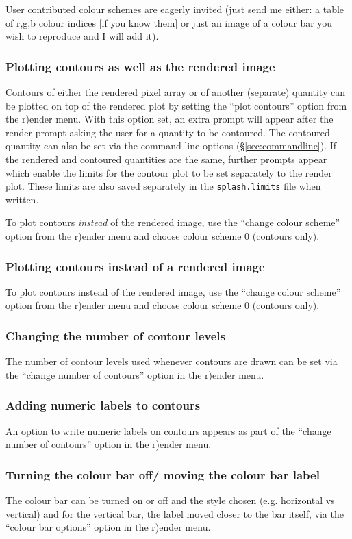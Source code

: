 \documentclass[a4paper,10pt]{article}
\begin{document}
 User contributed colour schemes are eagerly invited (just send me either: a table of r,g,b colour indices [if you know them] or just an image of a colour bar you wish to reproduce and I will add it).

\subsubsection{ Plotting contours as well as the rendered image}
 Contours of either the rendered pixel array or of another (separate) quantity can be plotted on top of the rendered plot by setting the ``plot contours'' option from the r)ender menu. With this option set, an extra prompt will appear after the render prompt asking the user for a quantity to be contoured. The contoured quantity can also be set via the command line options (\S\ref{sec:commandline}). If the rendered and contoured quantities are the same, further prompts appear which enable the limits for the contour plot to be set separately to the render plot. These limits are also saved separately in the \verb+splash.limits+ file when written.
 
 To plot contours \emph{instead} of the rendered image, use the ``change colour scheme'' option from the r)ender menu and choose colour scheme 0 (contours only). 

\subsubsection{ Plotting contours instead of a rendered image}
To plot contours instead of the rendered image, use the ``change colour scheme'' option from the r)ender menu and choose colour scheme 0 (contours only). 

\subsubsection{ Changing the number of contour levels}
 The number of contour levels used whenever contours are drawn can be set via the ``change number of contours'' option in the r)ender menu.

\subsubsection{ Adding numeric labels to contours}
 An option to write numeric labels on contours appears as part of the ``change number of contours'' option in the r)ender menu.

\subsubsection{ Turning the colour bar off/ moving the colour bar label}
 The colour bar can be turned on or off and the style chosen (e.g. horizontal vs vertical) and for the vertical bar, the label moved closer to the bar itself, via the ``colour bar options'' option in the r)ender menu.
 
\end{document}
